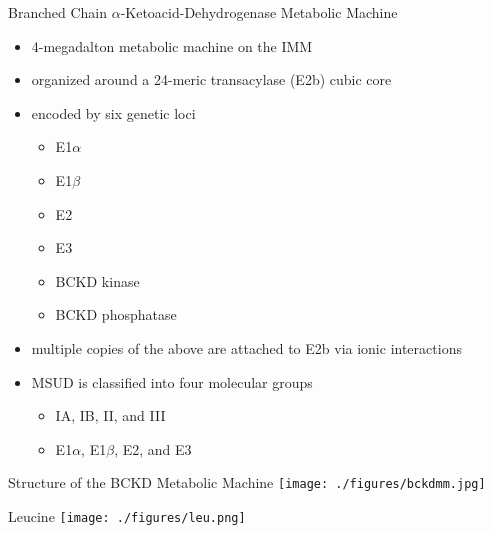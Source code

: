 \documentclass[presentation, smaller]{beamer}
\begin{document}
\begin{frame}[label={sec:orgheadline9}]{Branched Chain \(\alpha\)-Ketoacid-Dehydrogenase Metabolic Machine}
\begin{itemize}
\item 4-megadalton metabolic machine on the IMM
\item organized around a 24-meric transacylase (E2b) cubic core
\item encoded by six genetic loci
\begin{itemize}
\item E1\(\alpha\)
\item E1\(\beta\)
\item E2
\item E3
\item BCKD kinase
\item BCKD phosphatase
\end{itemize}
\item multiple copies of the above are attached to E2b via ionic interactions
\item MSUD is classified into four molecular groups
\begin{itemize}
\item IA, IB, II, and III
\item E1\(\alpha\), E1\(\beta\), E2, and E3
\end{itemize}
\end{itemize}
\end{frame}

\begin{frame}[label={sec:orgheadline10}]{Structure of the BCKD Metabolic Machine}
\centering
\texttt{[image: ./figures/bckdmm.jpg]}
\end{frame}

\begin{frame}[label={sec:orgheadline11}]{Leucine}
\centering
\texttt{[image: ./figures/leu.png]}
\end{frame}
\end{document}
